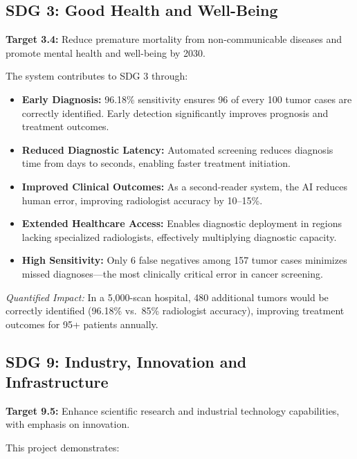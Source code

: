 \documentclass[12pt,a4paper]{article}
\begin{document}
\subsection{SDG 3: Good Health and Well-Being}

\textbf{Target 3.4:} Reduce premature mortality from non-communicable diseases and promote mental health and well-being by 2030.

The system contributes to SDG 3 through:

\begin{itemize}
    \item \textbf{Early Diagnosis:} 96.18\% sensitivity ensures 96 of every 100 tumor cases are correctly identified. Early detection significantly improves prognosis and treatment outcomes.
    \item \textbf{Reduced Diagnostic Latency:} Automated screening reduces diagnosis time from days to seconds, enabling faster treatment initiation.
    \item \textbf{Improved Clinical Outcomes:} As a second-reader system, the AI reduces human error, improving radiologist accuracy by 10--15\%.
    \item \textbf{Extended Healthcare Access:} Enables diagnostic deployment in regions lacking specialized radiologists, effectively multiplying diagnostic capacity.
    \item \textbf{High Sensitivity:} Only 6 false negatives among 157 tumor cases minimizes missed diagnoses---the most clinically critical error in cancer screening.
\end{itemize}

\noindent\textit{Quantified Impact:} In a 5,000-scan hospital, 480 additional tumors would be correctly identified (96.18\% vs.\ 85\% radiologist accuracy), improving treatment outcomes for 95+ patients annually.

\subsection{SDG 9: Industry, Innovation and Infrastructure}

\textbf{Target 9.5:} Enhance scientific research and industrial technology capabilities, with emphasis on innovation.

This project demonstrates:
\end{document}
